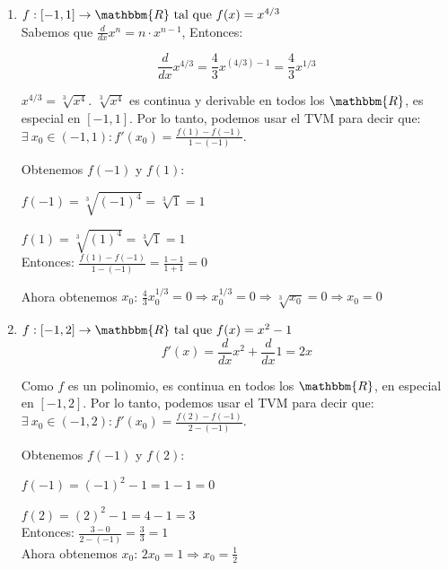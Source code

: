 \documentclass[12pt]{article}
\begin{document}
\begin{enumerate}[\hspace{9px} a)]
    \item \(f: [-1,1] \rightarrow \mathbbm{R} \ \text{tal que} \ f(x)=x^{4/3}\)\\

        Sabemos que \(\frac{d}{dx}x^n=n\cdot x^{n-1}\), Entonces:

        \[\displaystyle\frac{d}{dx}x^{4/3}=\frac{4}{3}x^{(4/3)-1}=\frac{4}{3}x^{1/3}\]

        \(x^{4/3}=\sqrt[3]{x^4}\). \quad $\sqrt[3]{x^4}$ es continua y derivable en todos los $\mathbbm{R}$, es especial en $[-1,1]$. Por lo tanto, podemos usar el TVM para decir que: \(\exists \ x_0 \in (-1,1) : f'(x_0)=\displaystyle\frac{f(1)-f(-1)}{1-(-1)}\).

        Obtenemos $f(-1)$ y $f(1)$:

        \(f(-1)=\sqrt[3]{(-1)^4}=\sqrt[3]{1}=1\)

        \(f(1)=\sqrt[3]{(1)^4}=\sqrt[3]{1}=1\)\\

        Entonces: \quad \(\displaystyle\frac{f(1)-f(-1)}{1-(-1)}=\frac{1-1}{1+1}=0\)

        Ahora obtenemos $x_0$: \quad \(\displaystyle\frac{4}{3}x_0^{1/3}=0 \Longrightarrow x_0^{1/3}=0 \Rightarrow \sqrt[3]{x_0}=0 \Rightarrow x_0=0\)\\

    \item \(f: [-1,2] \rightarrow \mathbbm{R} \ \text{tal que} \ f(x)=x^2-1\)\\

        \[f'(x)=\displaystyle\frac{d}{dx}x^2+\frac{d}{dx}1=2x\]

        Como $f$ es un polinomio, es continua en todos los $\mathbbm{R}$, en especial en $[-1,2]$. Por lo tanto, podemos usar el TVM para decir que: \(\exists \ x_0 \in (-1,2) : f'(x_0)=\displaystyle\frac{f(2)-f(-1)}{2-(-1)}\).

        Obtenemos $f(-1)$ y $f(2)$:

        \(f(-1)=(-1)^2-1=1-1=0\)

        \(f(2)=(2)^2-1=4-1=3\)\\

        Entonces: \quad \(\displaystyle\frac{3-0}{2-(-1)}=\frac{3}{3}=1\)\\

        Ahora obtenemos $x_0$: \quad \(2x_0=1 \Rightarrow x_0=\frac{1}{2}\)\\


\end{enumerate}
\end{document}
